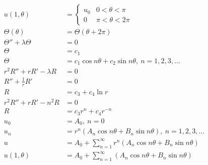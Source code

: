 \documentclass{article}
\begin{document}
\begin{align*}
  u(1, \theta)               & = \begin{cases}
                                   u_0 & 0 < \theta < \pi     \\
                                   0   & \pi < \theta < 2 \pi
                                 \end{cases}                                                                     \\
  \Theta(\theta)             & = \Theta(\theta + 2 \pi)                                                                         \\
  \Theta'' + \lambda \Theta  & = 0                                                                                              \\
  \Theta                     & = c_1                                                                                            \\
  \Theta                     & = c_1 \cos n \theta + c_2 \sin n \theta,\ n = 1, 2, 3, \ldots                                    \\
  r^2 R'' + r R' - \lambda R & = 0                                                                                              \\
  R'' + \frac{1}{r} R'       & = 0                                                                                              \\
  R                          & = c_3 + c_4 \ln r                                                                                \\
  r^2 R'' + r R' - n^2 R     & = 0                                                                                              \\
  R                          & = c_3 r^n + c_4 r^{-n}                                                                           \\
  u_0                        & = A_0,\ n = 0                                                                                    \\
  u_n                        & = r^n (A_n \cos n \theta + B_n \sin n \theta),\ n = 1, 2, 3, \ldots                              \\
  u                          & = A_0 + \sum_{n = 1}^\infty r^n (A_n \cos n \theta + B_n \sin n \theta)                          \\
  u(1, \theta)               & = A_0 + \sum_{n = 1}^\infty (A_n \cos n \theta + B_n \sin n \theta)                              \\

\end{align*}
\end{document}
